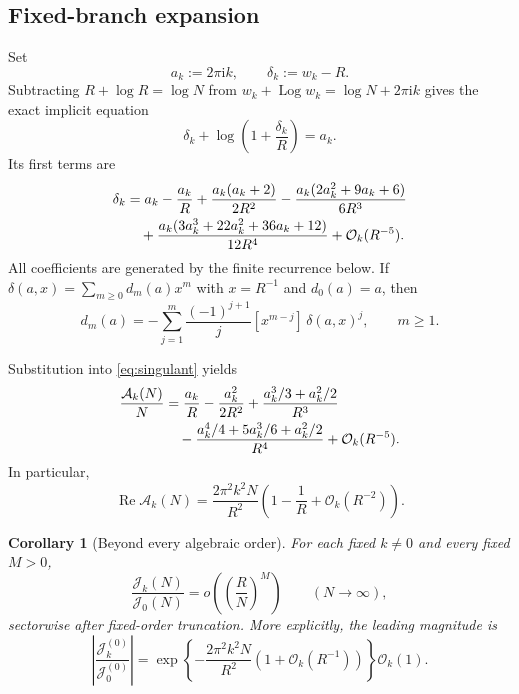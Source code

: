 \documentclass[11pt,a4paper]{article}
\newtheorem{corollary}[theorem]{Corollary}
\theoremstyle{definition}
\newcommand{\ii}{\mathrm i}
\newcommand{\cA}{\mathcal A}
\newcommand{\cJ}{\mathcal J}
\newcommand{\Log}{\operatorname{Log}}
\newcommand{\bigO}{\mathcal O}
\newcommand{\smallo}{o}
\DeclareMathOperator{\RePart}{Re}
\begin{document}
\subsection{Fixed-branch expansion}

Set
\begin{equation}\label{eq:delta-def}
 a_k:=2\pi\ii k,
 \qquad \delta_k:=w_k-R.
\end{equation}
Subtracting $R+\log R=\log N$ from
$w_k+\Log w_k=\log N+2\pi\ii k$ gives the exact implicit equation
\begin{equation}\label{eq:delta-implicit}
 \delta_k+\log\!\left(1+\frac{\delta_k}{R}\right)=a_k.
\end{equation}
Its first terms are
\begin{align}
 \delta_k
 &=a_k-\frac{a_k}{R}
 +\frac{a_k(a_k+2)}{2R^2}
 -\frac{a_k(2a_k^2+9a_k+6)}{6R^3}\notag\\
 &\quad+\frac{a_k(3a_k^3+22a_k^2+36a_k+12)}{12R^4}
 +\bigO_k(R^{-5}).\label{eq:delta-expanded}
\end{align}
All coefficients are generated by the finite recurrence below.  If
$\delta(a,x)=\sum_{m\ge0}d_m(a)x^m$ with $x=R^{-1}$ and $d_0(a)=a$, then
\begin{equation}\label{eq:delta-recurrence}
 d_m(a)=-\sum_{j=1}^{m}\frac{(-1)^{j+1}}{j}
 [x^{m-j}]\,\delta(a,x)^j,
 \qquad m\ge1.
\end{equation}

Substitution into \eqref{eq:singulant} yields
\begin{align}
 \frac{\cA_k(N)}{N}
 &=\frac{a_k}{R}-\frac{a_k^2}{2R^2}
 +\frac{a_k^3/3+a_k^2/2}{R^3}\notag\\
 &\quad-\frac{a_k^4/4+5a_k^3/6+a_k^2/2}{R^4}
 +\bigO_k(R^{-5}).\label{eq:singulant-expanded}
\end{align}
In particular,
\begin{equation}\label{eq:singulant-real}
 \RePart\cA_k(N)=
 \frac{2\pi^2k^2N}{R^2}
 \left(1-\frac1R+\bigO_k(R^{-2})\right).
\end{equation}

\begin{corollary}[Beyond every algebraic order]\label{cor:beyond-all-orders}
For each fixed $k\ne0$ and every fixed $M>0$,
\begin{equation}\label{eq:beyond-all-orders}
 \frac{\cJ_k(N)}{\cJ_0(N)}
 =\smallo\!\left(\left(\frac{R}{N}\right)^M\right)
 \qquad(N\to\infty),
\end{equation}
sectorwise after fixed-order truncation.  More explicitly, the leading
magnitude is
\begin{equation}\label{eq:sector-magnitude}
 \left|\frac{\cJ_k^{(0)}}{\cJ_0^{(0)}}\right|
 =\exp\!\left\{-\frac{2\pi^2k^2N}{R^2}
 \left(1+\bigO_k(R^{-1})\right)\right\}\bigO_k(1).
\end{equation}
\end{corollary}
\end{document}
